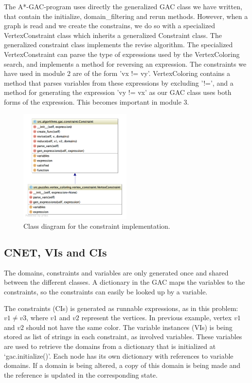 

The A*-GAC-program uses directly the generalized GAC class we have written, that contain the initialize, domain\_filtering and rerun methods. However, when a graph is read and we create the constrains, we do so with a specialized VertexConstraint class which inherits a generalized Constraint class. The generalized constraint class implements the revise algorithm. The specialized VertexConstraint can parse the type of expressions used by the VertexColoring search, and implements a method for reversing an expression. The constraints we have used in module 2 are of the form 'vx != vy'. VertexColoring contains a method that parses variables from these expressions by excluding '!=', and a method for generating the expression 'vy != vx' as our GAC class uses both forms of the expression. This becomes important in module 3.

\begin{figure}[h!]
  \centering
    \includegraphics[width=0.5\textwidth]{module_2/images/vertex_constraint}
  \caption{Class diagram for the constraint implementation. }
  \label{constraint:vertex}
\end{figure}

\subsection{CNET, VIs and CIs}
The domains, constraints and variables are only generated once and shared between the different classes. A dictionary in the GAC maps the variables to the constraints, so the constraints can easily be looked up by a variable.

The constraints (CIs) is generated as runnable expressions, as in this problem: \( v1 \neq v3 \), where \(v1\) and \(v2\) represent the vertices. In previous example, vertex \(v1\) and \(v2\) should not have the same color. The variable instances (VIs) is being stored as list of strings in each constraint, as involved variables. These variables are used to retrieve the domains from a dictionary that is initialized at `gac.initialize()'. Each node has its own dictionary with references to variable domains. If a domain is being altered, a copy of this domain is being made and the reference is updated in the corresponding state.

